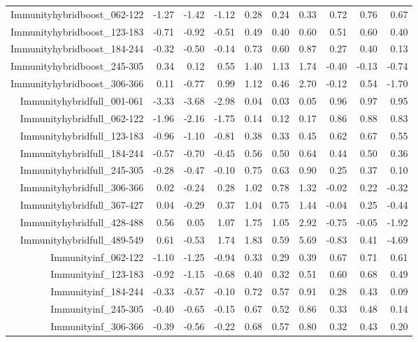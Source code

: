 \begin{table}[ht]
\begin{tabular}{rrrrrrrrrr}
  Immunityhybridboost\_062-122 & -1.27 & -1.42 & -1.12 & 0.28 & 0.24 & 0.33 & 0.72 & 0.76 & 0.67 \\ 
  Immunityhybridboost\_123-183 & -0.71 & -0.92 & -0.51 & 0.49 & 0.40 & 0.60 & 0.51 & 0.60 & 0.40 \\ 
  Immunityhybridboost\_184-244 & -0.32 & -0.50 & -0.14 & 0.73 & 0.60 & 0.87 & 0.27 & 0.40 & 0.13 \\ 
  Immunityhybridboost\_245-305 & 0.34 & 0.12 & 0.55 & 1.40 & 1.13 & 1.74 & -0.40 & -0.13 & -0.74 \\ 
  Immunityhybridboost\_306-366 & 0.11 & -0.77 & 0.99 & 1.12 & 0.46 & 2.70 & -0.12 & 0.54 & -1.70 \\ 
  Immunityhybridfull\_001-061 & -3.33 & -3.68 & -2.98 & 0.04 & 0.03 & 0.05 & 0.96 & 0.97 & 0.95 \\ 
  Immunityhybridfull\_062-122 & -1.96 & -2.16 & -1.75 & 0.14 & 0.12 & 0.17 & 0.86 & 0.88 & 0.83 \\ 
  Immunityhybridfull\_123-183 & -0.96 & -1.10 & -0.81 & 0.38 & 0.33 & 0.45 & 0.62 & 0.67 & 0.55 \\ 
  Immunityhybridfull\_184-244 & -0.57 & -0.70 & -0.45 & 0.56 & 0.50 & 0.64 & 0.44 & 0.50 & 0.36 \\ 
  Immunityhybridfull\_245-305 & -0.28 & -0.47 & -0.10 & 0.75 & 0.63 & 0.90 & 0.25 & 0.37 & 0.10 \\ 
  Immunityhybridfull\_306-366 & 0.02 & -0.24 & 0.28 & 1.02 & 0.78 & 1.32 & -0.02 & 0.22 & -0.32 \\ 
  Immunityhybridfull\_367-427 & 0.04 & -0.29 & 0.37 & 1.04 & 0.75 & 1.44 & -0.04 & 0.25 & -0.44 \\ 
  Immunityhybridfull\_428-488 & 0.56 & 0.05 & 1.07 & 1.75 & 1.05 & 2.92 & -0.75 & -0.05 & -1.92 \\ 
  Immunityhybridfull\_489-549 & 0.61 & -0.53 & 1.74 & 1.83 & 0.59 & 5.69 & -0.83 & 0.41 & -4.69 \\ 
  Immunityinf\_062-122 & -1.10 & -1.25 & -0.94 & 0.33 & 0.29 & 0.39 & 0.67 & 0.71 & 0.61 \\ 
  Immunityinf\_123-183 & -0.92 & -1.15 & -0.68 & 0.40 & 0.32 & 0.51 & 0.60 & 0.68 & 0.49 \\ 
  Immunityinf\_184-244 & -0.33 & -0.57 & -0.10 & 0.72 & 0.57 & 0.91 & 0.28 & 0.43 & 0.09 \\ 
  Immunityinf\_245-305 & -0.40 & -0.65 & -0.15 & 0.67 & 0.52 & 0.86 & 0.33 & 0.48 & 0.14 \\ 
  Immunityinf\_306-366 & -0.39 & -0.56 & -0.22 & 0.68 & 0.57 & 0.80 & 0.32 & 0.43 & 0.20 \\ 

\end{tabular}
\end{table}
